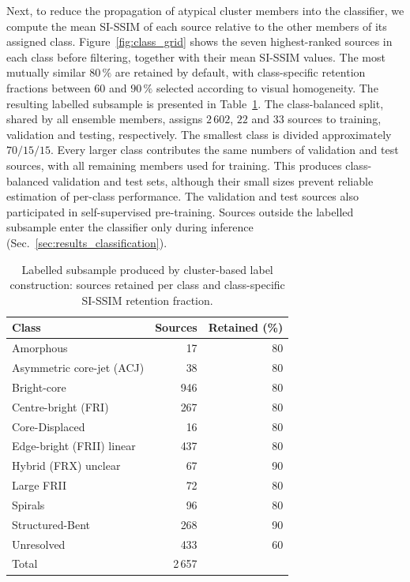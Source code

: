 Next, to reduce the propagation of atypical cluster members into the classifier, we compute the mean SI-SSIM of each source relative to the other members of its assigned class.
Figure~\ref{fig:class_grid} shows the seven highest-ranked sources in each class before filtering, together with their mean SI-SSIM values.
The most mutually similar \(80\,\%\) are retained by default, with class-specific retention fractions between \(60\) and \(90\,\%\) selected according to visual homogeneity.
The resulting labelled subsample is presented in Table~\ref{tab:labelled_subsample}.
The class-balanced split, shared by all ensemble members, assigns \(2\,602\), \(22\) and \(33\) sources to training, validation and testing, respectively.
The smallest class is divided approximately \(70/15/15\). Every larger class contributes the same numbers of validation and test sources, with all remaining members used for training. This produces class-balanced validation and test sets, although their small sizes prevent reliable estimation of per-class performance.
The validation and test sources also participated in self-supervised pre-training.
Sources outside the labelled subsample enter the classifier only during inference (Sec.~\ref{sec:results_classification}).

\begin{table}[H]
\centering
\begin{tabular}{lrr}
\toprule
Class & Sources & Retained (\%) \\
\midrule
Amorphous & 17 & 80 \\
Asymmetric core-jet (ACJ) & 38 & 80 \\
Bright-core & 946 & 80 \\
Centre-bright (FRI) & 267 & 80 \\
Core-Displaced & 16 & 80 \\
Edge-bright (FRII) linear & 437 & 80 \\
Hybrid (FRX) unclear & 67 & 90 \\
Large FRII & 72 & 80 \\
Spirals & 96 & 80 \\
Structured-Bent & 268 & 90 \\
Unresolved & 433 & 60 \\
\midrule
Total & 2\,657 & \\
\bottomrule
\end{tabular}
\caption[Labelled subsample and SI-SSIM retention fractions]{Labelled subsample produced by cluster-based label construction: sources retained per class and class-specific SI-SSIM retention fraction.}
\label{tab:labelled_subsample}
\end{table}

